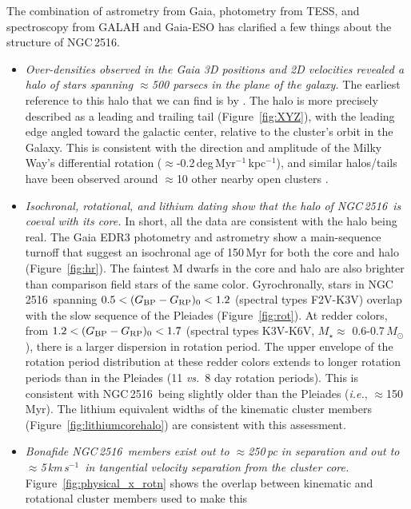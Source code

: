 \documentclass[12pt,twocolumn,tighten]{aastex63}
\newcommand{\cn}{NGC\,2516} %
\newcommand{\kms}{\,km\,s$^{-1}$}
\newcommand{\bpmrpo}{(G_{\rm BP}-G_{\rm RP})_0}
\begin{document}
The combination of astrometry from Gaia, photometry from TESS, and
spectroscopy from GALAH and Gaia-ESO has clarified a few things about
the structure of \cn.
\begin{itemize}
  \item {\it Over-densities observed in the Gaia 3D positions and 2D
    velocities revealed a halo of stars spanning $\approx$500 parsecs
    in the plane of the galaxy.} The earliest reference to this halo
    that we can find is by \citet{kounkel_untangling_2019}.  The halo
    is more precisely described as a leading and trailing tail
    (Figure~\ref{fig:XYZ}), with the leading edge angled toward the
    galactic center, relative to the cluster's orbit in the Galaxy.
    This is consistent with the direction and amplitude of the Milky
    Way's differential rotation
    ($\approx$-0.2\,deg\,Myr$^{-1}$\,kpc$^{-1}$), and similar
    halos/tails have been observed around $\approx$10 other nearby
    open clusters \citep{meingast_2021}.
  \item {\it Isochronal, rotational, and lithium dating show that the
    halo of \cn\ is coeval with its core.} In short, all the data are
    consistent with the halo being real.  The Gaia EDR3 photometry and
    astrometry show a main-sequence turnoff that suggest an isochronal
    age of 150\,Myr for both the core and halo (Figure~\ref{fig:hr}).
    The faintest M dwarfs in the core and halo are also brighter than
    comparison field stars of the same color.  Gyrochronally, stars in
    \cn\ spanning $0.5<\bpmrpo<1.2$ (spectral types F2V-K3V) overlap
    with the slow sequence of the Pleiades (Figure~\ref{fig:rot}).  At
    redder colors, from $1.2<\bpmrpo<1.7$ (spectral types K3V-K6V,
    $M_\star$$\approx$ 0.6-0.7\,$M_\odot$), there is a larger
    dispersion in rotation period.  The upper envelope of the rotation
    period distribution at these redder colors extends to longer
    rotation periods than in the Pleiades (11 {\it vs.}\ 8 day
    rotation periods).  This is consistent with \cn\ being slightly
    older than the Pleiades ({\it i.e.}, $\approx$150\,Myr).  The
    lithium equivalent widths of the kinematic cluster members
    (Figure~\ref{fig:lithiumcorehalo}) are consistent with this
    assessment.
  \item {\it Bonafide \cn\ members exist out to $\approx$250\,pc in
    separation and out to $\approx$5\kms\ in tangential velocity
    separation from the cluster core.}
    Figure~\ref{fig:physical_x_rotn} shows the overlap between
    kinematic and rotational cluster members used to make this
$$
\end{itemize}
\end{document}
